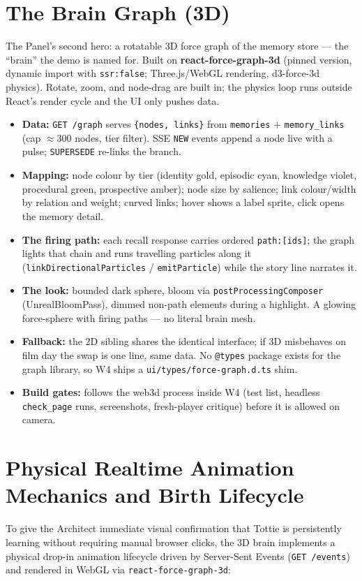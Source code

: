 \section{The Brain Graph (3D)}
The Panel's second hero: a rotatable 3D force graph of the memory store --- the ``brain'' the demo
is named for. Built on \textbf{react-force-graph-3d} (pinned version, dynamic import with
\texttt{ssr:false}; Three.js/WebGL rendering, d3-force-3d physics). Rotate, zoom, and node-drag
are built in; the physics loop runs outside React's render cycle and the UI only pushes data.
\begin{itemize}
  \item \textbf{Data:} \texttt{GET /graph} serves \texttt{\{nodes, links\}} from \texttt{memories} +
  \texttt{memory\_links} (cap $\approx$300 nodes, tier filter). SSE \texttt{NEW} events append a
  node live with a pulse; \texttt{SUPERSEDE} re-links the branch.
  \item \textbf{Mapping:} node colour by tier (identity gold, episodic cyan, knowledge violet,
  procedural green, prospective amber); node size by salience; link colour/width by relation and
  weight; curved links; hover shows a label sprite, click opens the memory detail.
  \item \textbf{The firing path:} each recall response carries ordered \texttt{path:[ids]}; the graph
  lights that chain and runs travelling particles along it (\texttt{linkDirectionalParticles} /
  \texttt{emitParticle}) while the story line narrates it.
  \item \textbf{The look:} bounded dark sphere, bloom via \texttt{postProcessingComposer}
  (UnrealBloomPass), dimmed non-path elements during a highlight. A glowing force-sphere with
  firing paths --- no literal brain mesh.
  \item \textbf{Fallback:} the 2D sibling shares the identical interface; if 3D misbehaves on film
  day the swap is one line, same data. No \texttt{@types} package exists for the graph
  library, so W4 ships a \texttt{ui/types/force-graph.d.ts} shim.
  \item \textbf{Build gates:} follows the web3d process inside W4 (test list, headless
  \texttt{check\_page} runs, screenshots, fresh-player critique) before it is allowed on camera.
\end{itemize}

\section{Physical Realtime Animation Mechanics and Birth Lifecycle}
To give the Architect immediate visual confirmation that Tottie is persistently learning without
requiring manual browser clicks, the 3D brain implements a physical drop-in animation lifecycle
driven by Server-Sent Events (\texttt{GET /events}) and rendered in WebGL via
\texttt{react-force-graph-3d}:

